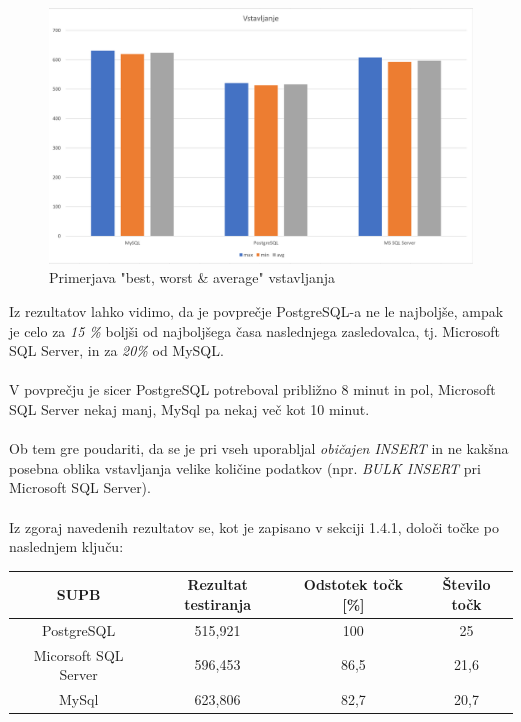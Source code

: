 \documentclass[a4paper,11pt]{report}
\begin{document}
\begin{figure}[htb]
   \noindent\includegraphics[width=\linewidth]{./pics/vstavljanje001.png}
   \caption{Primerjava "best, worst \& average" vstavljanja}
\end{figure}

\pagebreak

Iz rezultatov lahko vidimo, da je povprečje PostgreSQL-a ne le najboljše, ampak je celo za \textit{15 \%} 
boljši od najboljšega časa naslednjega zasledovalca, tj. Microsoft SQL Server, in za \textit{20\%} od MySQL.
\\\\
V povprečju je sicer PostgreSQL potreboval približno 8 minut in pol, Microsoft SQL Server nekaj manj, MySql pa nekaj več kot 10 minut.
\\\\
Ob tem gre poudariti, da se je pri vseh uporabljal \textit{običajen INSERT} in ne kakšna posebna oblika vstavljanja velike količine podatkov (npr. \textit{BULK INSERT} pri Microsoft SQL Server).
\\\\
Iz zgoraj navedenih rezultatov se, kot je zapisano v sekciji 1.4.1, določi točke po naslednjem ključu:

\begin{center}
   \begin{tabular}{||c|c|c|c||}
      \hline
      \textbf{SUPB} & Rezultat testiranja & Odstotek točk [\%] & Število točk\\
      \hline
      \hline
      PostgreSQL & 515,921 & 100 & 25\\
      Micorsoft SQL Server & 596,453 & 86,5 & 21,6\\
      MySql & 623,806 & 82,7 & 20,7\\
      \hline
   \end{tabular}
\end{center}
\end{document}
